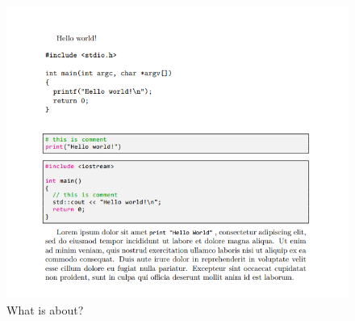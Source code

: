 \documentclass[a4paper]{article}
\begin{document}
\begin{figure}
  \includegraphics[width=\linewidth]{filename.png}
  \caption{What is about?}
  \label{fig:whateverlabel}
\end{figure}
\end{document}
